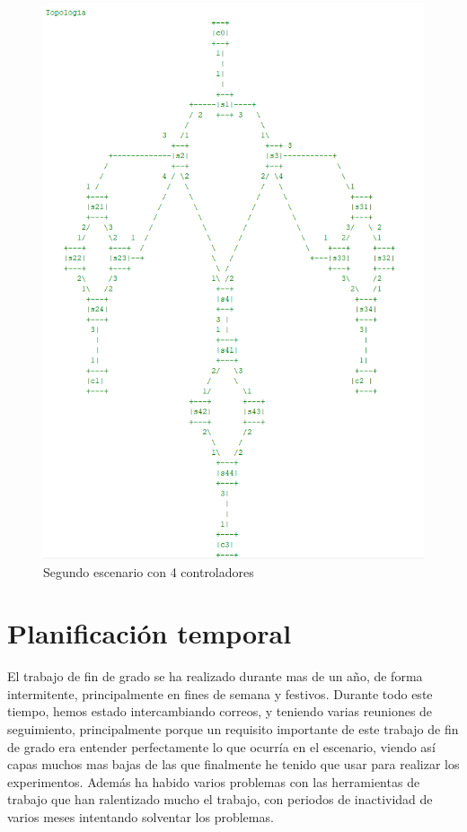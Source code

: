 \documentclass[a4paper, 12pt]{book}
\begin{document}
		\begin{figure}
			\centering
			\includegraphics[width=16cm, keepaspectratio]{img/mesh4c}
			\caption{Segundo escenario con 4 controladores}
			\label{figura:mesh4c}
		\end{figure}
	
	\cleardoublepage
	\section{Planificación temporal}
	\label{sec:planificacion-temporal}
	
	El trabajo de fin de grado se ha realizado durante mas de un año, de forma intermitente, principalmente en fines de semana y festivos. Durante todo este tiempo, hemos estado intercambiando correos, y teniendo varias reuniones de seguimiento, principalmente porque un requisito importante de este trabajo de fin de grado era entender perfectamente lo que ocurría en el escenario, viendo así capas muchos mas bajas de las que finalmente he tenido que usar para realizar los experimentos.
	Además ha habido varios problemas con las herramientas de trabajo que han ralentizado mucho el trabajo, con periodos de inactividad de varios meses intentando solventar los problemas.
	
\end{document}
